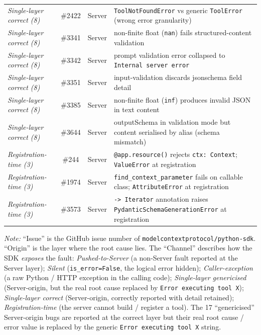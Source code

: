 \begin{table}[!t]
\begin{tabularx}{\textwidth}{@{}>{\centering\arraybackslash}X{} >{\centering\arraybackslash}c >{\centering\arraybackslash}c >{\arraybackslash}X{}@{}}
\emph{Single-layer correct (8)} & \#2422 & Server & \texttt{ToolNotFoundError} vs generic \texttt{ToolError} (wrong error granularity) \\
\emph{Single-layer correct (8)} & \#3341 & Server & non-finite float (\texttt{nan}) fails structured-content validation \\
\emph{Single-layer correct (8)} & \#3342 & Server & prompt validation error collapsed to \texttt{Internal server error} \\
\emph{Single-layer correct (8)} & \#3351 & Server & input-validation discards jsonschema field detail \\
\emph{Single-layer correct (8)} & \#3385 & Server & non-finite float (\texttt{inf}) produces invalid JSON in text content \\
\emph{Single-layer correct (8)} & \#3644 & Server & outputSchema in validation mode but content serialised by alias (schema mismatch) \\
\midrule
\emph{Registration-time (3)} & \#244 & Server & \texttt{@app.resource()} rejects \texttt{ctx: Context}; \texttt{ValueError} at registration \\
\emph{Registration-time (3)} & \#1974 & Server & \texttt{find\_context\_parameter} fails on callable class; \texttt{AttributeError} at registration \\
\emph{Registration-time (3)} & \#3573 & Server & \texttt{-> Iterator} annotation raises \texttt{PydanticSchemaGenerationError} at registration \\
\bottomrule
\end{tabularx}
\vspace{0.35em}
\parbox{\textwidth}{\scriptsize\raggedright
\textit{Note:} ``Issue'' is the GitHub issue number of \texttt{modelcontextprotocol/python-sdk}.
``Origin'' is the layer where the root cause lies. The ``Channel'' describes how the SDK \emph{exposes}
the fault: \emph{Pushed-to-Server} (a non-Server fault reported at the Server layer); \emph{Silent}
(\texttt{is\_error=False}, the logical error hidden); \emph{Caller-exception} (a raw Python / HTTP
exception in the calling code); \emph{Single-layer genericised} (Server-origin, but the real root
cause replaced by \texttt{Error executing tool X}); \emph{Single-layer correct} (Server-origin,
correctly reported with detail retained); \emph{Registration-time} (the server cannot build /
register a tool). The 17 ``genericised'' Server-origin bugs are reported at the correct layer but
their real root cause / error value is replaced by the generic \texttt{Error executing tool X} string.}
\end{table}

